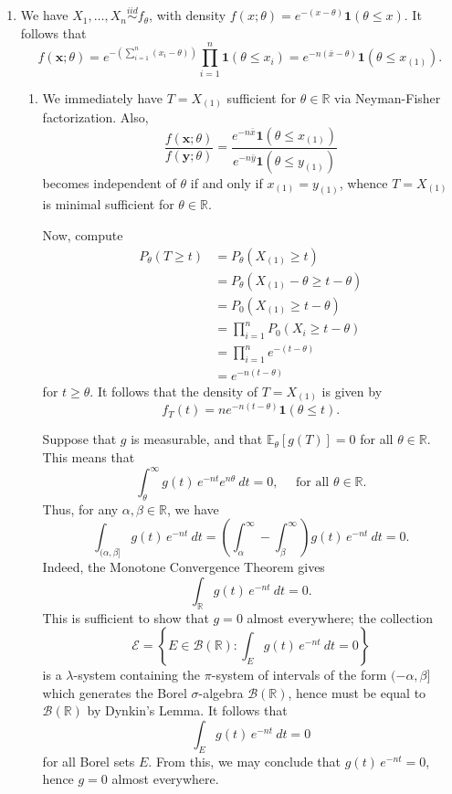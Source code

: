 \documentclass[11pt]{article}
\newcommand{\R}{\mathbb{R}}
\begin{document}
\begin{enumerate}
    \item We have $X_1, \dots, X_n \overset{iid}{\sim} f_\theta$, with density
    $f(x; \theta) = e^{-(x - \theta)} \bm{1}(\theta \leq x)$.
    It follows that \[
        f(\bm{x}; \theta)
            = e^{-\left(\sum_{i = 1}^n (x_i - \theta)\right)} \prod_{i = 1}^n \bm{1}(\theta \leq x_i)
            = e^{-n(\bar{x} - \theta)} \bm{1}(\theta \leq x_{(1)}).
    \]
    \begin{enumerate}
        \item We immediately have $T = X_{(1)}$ sufficient for $\theta \in \R$
        via Neyman-Fisher factorization.
        Also, \[
            \frac{f(\bm{x}; \theta)}{f(\bm{y}; \theta)} = \frac{e^{-n\bar{x}} \bm{1}(\theta \leq x_{(1)})}{e^{-n\bar{y}} \bm{1}(\theta \leq y_{(1)})}
        \] becomes independent of $\theta$ if and only if $x_{(1)} = y_{(1)}$,
        whence $T = X_{(1)}$ is minimal sufficient for $\theta \in \R$.

        Now, compute \begin{align*}
            P_\theta(T \geq t)
                &= P_\theta(X_{(1)} \geq t) \\
                &= P_\theta(X_{(1)} - \theta \geq t - \theta) \\
                &= P_0(X_{(1)} \geq t - \theta) \\
                &= \prod_{i = 1}^n P_0(X_i \geq t - \theta) \\
                &= \prod_{i = 1}^n e^{-(t - \theta)} \\
                &= e^{-n(t - \theta)}
        \end{align*}
        for $t \geq \theta$.
        It follows that the density of $T = X_{(1)}$ is given by \[
            f_T(t) = ne^{-n(t - \theta)} \bm{1}(\theta \leq t).
        \]

        Suppose that $g$ is measurable, and that $\mathbb{E}_\theta[g(T)] = 0$
        for all $\theta \in \R$.
        This means that \[
            \int_\theta^\infty g(t)\, e^{-nt} e^{n\theta} \:dt = 0, \quad \text{ for all } \theta \in \R.
        \] Thus, for any $\alpha, \beta \in \R$, we have \[
            \int_{(\alpha, \beta]} g(t)\, e^{-nt}\:dt = \left(\int_{\alpha}^\infty - \int_{\beta}^\infty\right) g(t)\, e^{-nt} \:dt = 0.
        \] Indeed, the Monotone Convergence Theorem gives \[
            \int_\R g(t)\, e^{-nt} \:dt = 0.
        \] This is sufficient to show that $g = 0$ almost everywhere; the
        collection \[
            \mathcal{E} = \left\{E \in \mathcal{B}(\R)\colon \int_E g(t)\, e^{-nt} \:dt = 0\right\}
        \] is a $\lambda$-system containing the $\pi$-system of intervals of
        the form $(-\alpha, \beta]$ which generates the Borel $\sigma$-algebra
        $\mathcal{B}(\R)$, hence must be equal to $\mathcal{B}(\R)$ by
        Dynkin's Lemma.
        It follows that \[
            \int_E g(t)\, e^{-nt} \:dt = 0
        \] for all Borel sets $E$.
        From this, we may conclude that $g(t)\, e^{-nt} = 0$, hence $g = 0$
        almost everywhere.


\end{enumerate}
\end{enumerate}
\end{document}
